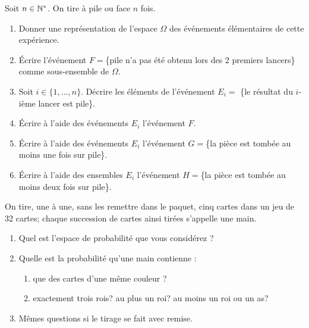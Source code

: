\documentclass[a4paper,12pt,reqno]{amsart}
\begin{document}
\begin{exo}

    Soit $n\in \mathbb{N}^*$. On tire à pile ou face $n$ fois.

    \begin{enumerate}
      \item Donner une représentation  de l'espace $\Omega$ des événements
      élémentaires de cette expérience.

      \item Écrire l'événement $F=$\{pile n'a pas été obtenu lors
      des 2 premiers lancers\} comme sous-ensemble de $\Omega$.

      \item Soit $i\in \{1,\ldots,n\}$.
      Décrire les éléments de l'événement $E_i=$
      \{le résultat du $i$-ième lancer est pile\}.

      \item Écrire à l'aide des événements $E_i$ l'événement $F$.

      \item Écrire à l'aide des événements $E_i$ l'événement
      $G=$\{la pièce est tombée au moins une fois sur pile\}.

      \item Écrire à l'aide des ensembles $E_i$ l'événement
      $H=$\{la pièce est tombée au moins deux fois sur pile\}.
    \end{enumerate}

\end{exo}


\begin{exo}

  On tire, une à une, sans les remettre dans le paquet, cinq cartes dans un jeu de 32 cartes; chaque succession de cartes  ainsi tirées s'appelle une main.
  \begin{enumerate}
    \item Quel est l'espace de probabilité que vous considérez ?
    \item Quelle est la probabilité qu'une main  contienne :
    \begin{enumerate}
      \item que des cartes d'une même couleur ?
      \item exactement trois rois? au plus un roi? au moins un roi ou un as?
    \end{enumerate}
    \item Mêmes questions si le tirage se fait avec remise.
  \end{enumerate}
\end{exo}
\end{document}
